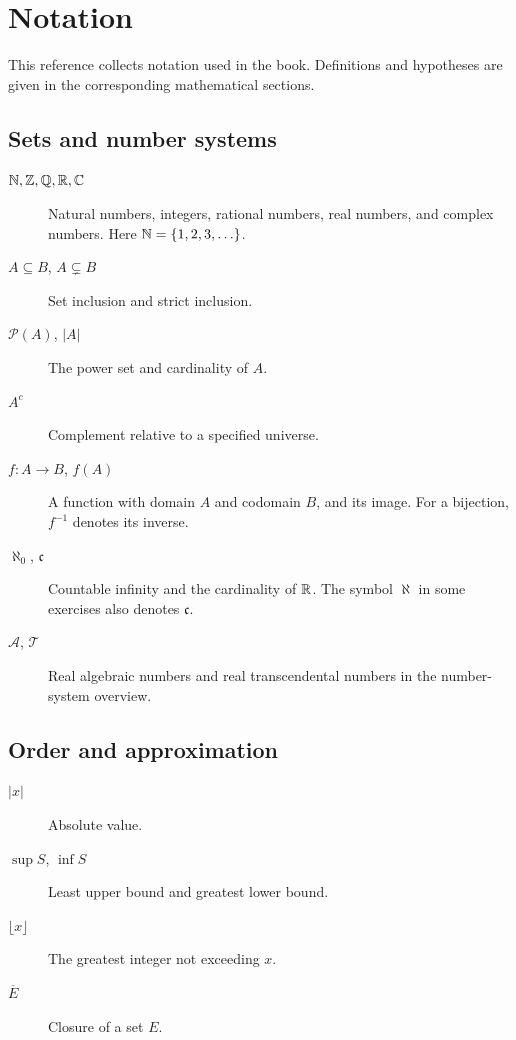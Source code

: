 \chapter{Notation}
\label{ch:appendix:notation}


This reference collects notation used in the book. Definitions and
hypotheses are given in the corresponding mathematical sections.

\section{Sets and number systems}
\begin{description}
  \item[$\mathbb{N},\mathbb{Z},\mathbb{Q},\mathbb{R},\mathbb{C}$] Natural numbers, integers, rational numbers,
    real numbers, and complex numbers. Here $\mathbb{N}=\{1,2,3,\ldots\}$.
  \item[$A\subseteq B$, $A\subsetneq B$] Set inclusion and strict inclusion.
  \item[$\mathcal P(A)$, $|A|$] The power set and cardinality of $A$.
  \item[$A^c$] Complement relative to a specified universe.
  \item[$f:A\to B$, $f(A)$] A function with domain $A$ and codomain $B$,
    and its image. For a bijection, $f^{-1}$ denotes its inverse.
  \item[$\aleph_0$, $\mathfrak c$] Countable infinity and the cardinality
    of $\mathbb{R}$. The symbol $\aleph$ in some exercises also denotes $\mathfrak c$.
  \item[$\mathcal A$, $\mathcal T$] Real algebraic numbers and real
    transcendental numbers in the number-system overview.
\end{description}

\section{Order and approximation}
\begin{description}
  \item[$|x|$] Absolute value.
  \item[$\sup S$, $\inf S$] Least upper bound and greatest lower bound.
  \item[$\lfloor x\rfloor$] The greatest integer not exceeding $x$.
  \item[$\overline E$] Closure of a set $E$.
\end{description}

